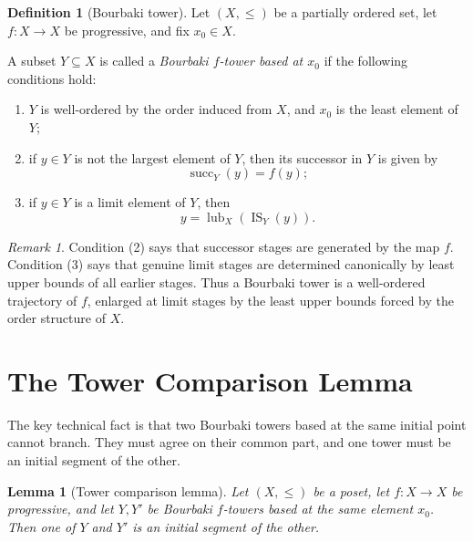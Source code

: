 \documentclass[11pt]{article}
\newtheorem{lemma}[theorem]{Lemma}
\theoremstyle{definition}
\newtheorem{definition}[theorem]{Definition}
\theoremstyle{remark}
\newtheorem{remark}[theorem]{Remark}
\newcommand{\IS}{\operatorname{IS}}
\newcommand{\lub}{\operatorname{lub}}
\newcommand{\succop}{\operatorname{succ}}
\begin{document}
\begin{definition}[Bourbaki tower]
Let \((X,\leq)\) be a partially ordered set, let \(f:X\to X\) be progressive, and fix
\(x_0\in X\).

A subset \(Y\subseteq X\) is called a \emph{Bourbaki \(f\)-tower based at \(x_0\)} if the
following conditions hold:
\begin{enumerate}
\item \(Y\) is well-ordered by the order induced from \(X\), and \(x_0\) is the least
element of \(Y\);

\item if \(y\in Y\) is not the largest element of \(Y\), then its successor in \(Y\) is
given by
\[
\succop_Y(y)=f(y);
\]

\item if \(y\in Y\) is a limit element of \(Y\), then
\[
y=\lub_X(\IS_Y(y)).
\]
\end{enumerate}
\end{definition}

\begin{remark}
Condition (2) says that successor stages are generated by the map \(f\). Condition (3)
says that genuine limit stages are determined canonically by least upper bounds of all
earlier stages. Thus a Bourbaki tower is a well-ordered trajectory of \(f\), enlarged at
limit stages by the least upper bounds forced by the order structure of \(X\).
\end{remark}

\section{The Tower Comparison Lemma}

The key technical fact is that two Bourbaki towers based at the same initial point cannot
branch. They must agree on their common part, and one tower must be an initial segment
of the other.

\begin{lemma}[Tower comparison lemma]
Let \((X,\leq)\) be a poset, let \(f:X\to X\) be progressive, and let \(Y,Y'\) be Bourbaki
\(f\)-towers based at the same element \(x_0\). Then one of \(Y\) and \(Y'\) is an initial
segment of the other.
\end{lemma}
\end{document}
